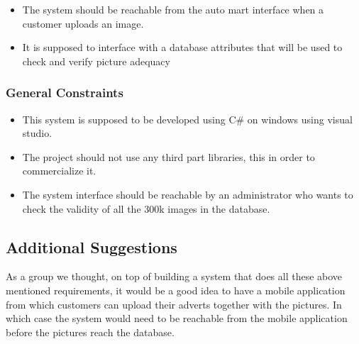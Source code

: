 \documentclass[12pt]{article}
\begin{document}
                                    \begin{itemize}
                                   						\item The system should be reachable from the auto mart interface when a customer uploads an image.
                                   						\item It is supposed to interface with a database attributes that will be used to check and verify picture adequacy
                                   						                                  
                                   						\end{itemize}
                                                     
                                  \subsubsection{General Constraints}
                                   \begin{itemize}
                                   						\item This system is supposed to be developed using C\# on windows using visual studio.
                                   						\item The project should not use any third part libraries, this in order to commercialize it.
                                   						\item The system interface should be reachable by an administrator who wants to check the validity of all the 300k images in the database.
                                   						\end{itemize}
                                   \subsection{Additional Suggestions}
                                   As a group we thought, on top of building a system that does all these above mentioned requirements, it would be a good idea to have a mobile application from which customers can upload their adverts together with the pictures. In which case the system would need to be reachable from the mobile application before the pictures reach the database.
                                   
\end{document}
